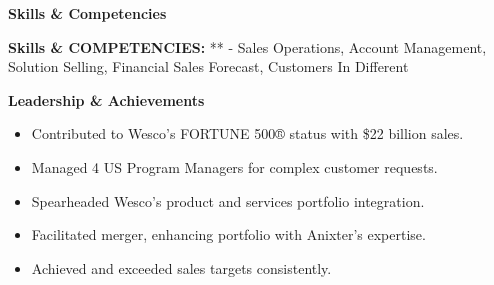 \documentclass[11pt]{article}
\begin{document}
\vspace{12pt}

\begin{center}
    \textbf{Skills \& Competencies}
\end{center}
\textbf{Skills \& COMPETENCIES:} **
- Sales Operations, Account Management, Solution Selling, Financial Sales Forecast, Customers In Different

\textbf{Leadership \& Achievements}
\begin{itemize}[noitemsep, topsep=0pt, partopsep=0pt, parsep=0pt, leftmargin=12pt]
    \item Contributed to Wesco's FORTUNE 500® status with \$22 billion sales.
    \item Managed 4 US Program Managers for complex customer requests.
    \item Spearheaded Wesco's product and services portfolio integration.
    \item Facilitated merger, enhancing portfolio with Anixter's expertise.
    \item Achieved and exceeded sales targets consistently.
\end{itemize}
\end{document}
